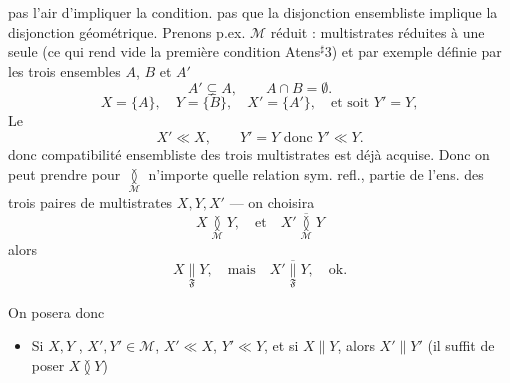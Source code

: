 \documentclass[11pt,a4paper]{article}
\begin{document}

 pas l'air d'impliquer la condition. \ill{} \ill{} \ill{} pas que  la disjonction ensembliste implique la disjonction géométrique. Prenons p.ex. $\mathcal{M}$ réduit :   multistrates \struck{\ill{}} réduites à une seule   (ce qui rend vide la première condition Atens$^{\sharp}$3) et par exemple définie par les trois ensembles $A$, $B$ et $A'$
\[
  A' \subsetneq A, \qquad A \cap B = \emptyset .
\]
 
\[
  X = \lbrace A \rbrace, \quad Y = \lbrace B \rbrace, \quad X' = \lbrace A' \rbrace, \quad \text{et soit } Y' = Y,
\]
 Le 
\[
  X' \ll X, \qquad Y' = Y \text{ donc } Y' \ll Y .
\]
donc \struck{\ill{}} \ill{} compatibilité ensembliste des trois   multistrates est déjà acquise. Donc on peut prendre pour $\underset{\mathcal{M}}{\between}$ n'importe quelle relation sym. refl.,   partie \struck{\ill{}} de l'ens. des trois paires de  multistrates $X, Y, X'$ --- on choisira
\[
  X \underset{\mathcal{M}}{\between} Y, \quad \text{et} \quad X' \underset{\mathcal{M}}{\overline{\between}} Y
\]
alors
\[
  X \underset{\mathfrak{F}}{\parallel} Y, \quad \text{mais} \quad X' \underset{\mathfrak{F}}{\overline{\parallel}} Y, \quad \text{ok.}
\]

On posera donc
\begin{itemize}
  \item[(*)] \struck{\ill{}} Si $X, Y$ \struck{\ill{}}, $X', Y' \in \mathcal{M}$, $X' \ll X$, $Y' \ll Y$, et si $X \parallel Y$, alors $X' \parallel Y'$ (il suffit de poser $X \between Y$)
\end{itemize}
\end{document}
